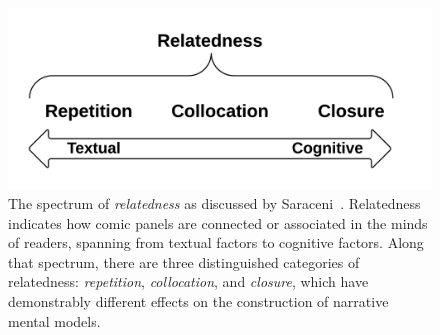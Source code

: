 %
\begin{figure}
	\centering
	\includegraphics[width=0.5\columnwidth]{relatedness.png}
	\caption{
		The spectrum of \emph{relatedness} as discussed by
                Saraceni~\cite{saraceni2016relatedness}. Relatedness indicates how 
		comic panels are connected or associated in the minds of 
		readers, spanning from textual factors to cognitive factors. 
		Along that spectrum, there are three  distinguished 
		categories of relatedness: \emph{repetition}, 
		\emph{collocation}, and \emph{closure}, which have
		demonstrably different effects on the construction of
		narrative mental models.
		}
	\label{figure:relatedness}
\end{figure}
%

